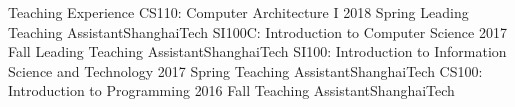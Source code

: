 \ifx\lang\eng
	\begin{rSection}{Teaching Experience}
		\rItem
			{CS110: Computer Architecture I }{ 2018 Spring }
			{Leading Teaching Assistant}{ShanghaiTech}
		\rItem
			{SI100C: Introduction to Computer Science }{ 2017 Fall }
			{Leading Teaching Assistant}{ShanghaiTech}
		\rItem
			{SI100: Introduction to Information Science and Technology }{ 2017 Spring }
			{Teaching Assistant}{ShanghaiTech}
		\rItem
			{CS100: Introduction to Programming }{ 2016 Fall }
			{Teaching Assistant}{ShanghaiTech}
	\end{rSection}
	\vspace{-1.75em}
\fi